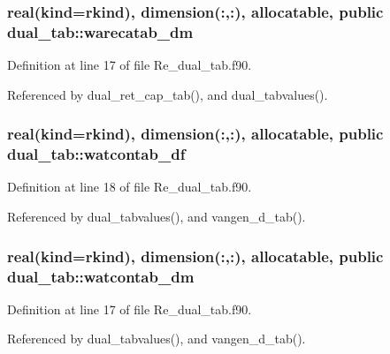 \subsubsection[{warecatab\+\_\+dm}]{\setlength{\rightskip}{0pt plus 5cm}real(kind=rkind), dimension(\+:,\+:), allocatable, public dual\+\_\+tab\+::warecatab\+\_\+dm}\label{namespacedual__tab_aa43892fad79b72c68bc0f68cc21f3a82}


Definition at line 17 of file Re\+\_\+dual\+\_\+tab.\+f90.



Referenced by dual\+\_\+ret\+\_\+cap\+\_\+tab(), and dual\+\_\+tabvalues().

\subsubsection[{watcontab\+\_\+df}]{\setlength{\rightskip}{0pt plus 5cm}real(kind=rkind), dimension(\+:,\+:), allocatable, public dual\+\_\+tab\+::watcontab\+\_\+df}\label{namespacedual__tab_a3d17fdbb05fbefcc1382976ebdd89dcc}


Definition at line 18 of file Re\+\_\+dual\+\_\+tab.\+f90.



Referenced by dual\+\_\+tabvalues(), and vangen\+\_\+d\+\_\+tab().

\subsubsection[{watcontab\+\_\+dm}]{\setlength{\rightskip}{0pt plus 5cm}real(kind=rkind), dimension(\+:,\+:), allocatable, public dual\+\_\+tab\+::watcontab\+\_\+dm}\label{namespacedual__tab_a516b6e32f177df7902a952361b8a7fbe}


Definition at line 17 of file Re\+\_\+dual\+\_\+tab.\+f90.



Referenced by dual\+\_\+tabvalues(), and vangen\+\_\+d\+\_\+tab().

